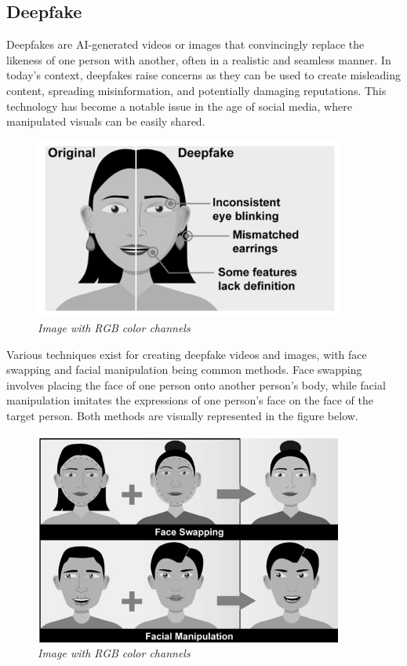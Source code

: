 \subsection{Deepfake}
Deepfakes are AI-generated videos or images that convincingly replace the likeness of one person with another, often in a realistic and seamless manner. In today's context, deepfakes raise concerns as they can be used to create misleading content, spreading misinformation, and potentially damaging reputations. This technology has become a notable issue in the age of social media, where manipulated visuals can be easily shared.\\

\begin{figure}[htbp]
    \centering
    \includegraphics[width=4in]{img/deefakeface.png}
    \caption{\textit{Image with RGB color channels}}
\end{figure}

Various techniques exist for creating deepfake videos and images, with face swapping and facial manipulation being common methods. Face swapping involves placing the face of one person onto another person's body, while facial manipulation imitates the expressions of one person's face on the face of the target person. Both methods are visually represented in the figure below.\\

\begin{figure}[htbp]
    \centering
    \includegraphics[width=4in]{img/face manipulation.png}
    \caption{\textit{Image with RGB color channels}}
\end{figure}

\newpage


